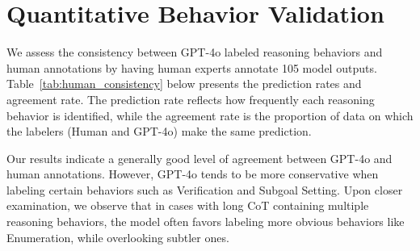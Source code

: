

\section{Quantitative Behavior Validation}
\label{sec:human_consistency}
We assess the consistency between GPT-4o labeled reasoning behaviors and human annotations by having human experts annotate 105 model outputs. Table~\ref{tab:human_consistency} below presents the prediction rates and agreement rate. The prediction rate reflects how frequently each reasoning behavior is identified, while the agreement rate is the proportion of data on which the labelers (Human and GPT-4o) make the same prediction.

Our results indicate a generally good level of agreement between GPT-4o and human annotations. However, GPT-4o tends to be more conservative when labeling certain behaviors such as Verification and Subgoal Setting. Upon closer examination, we observe that in cases with long CoT containing multiple reasoning behaviors, the model often favors labeling more obvious behaviors like Enumeration, while overlooking subtler ones.

